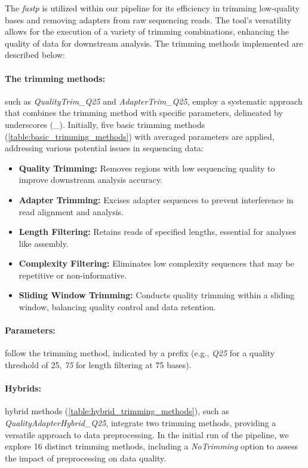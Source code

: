 The \textit{fastp} is utilized within our pipeline for its efficiency in \gls{trimming} low-quality bases and removing adapters from raw sequencing reads. The tool's versatility allows for the execution of a variety of \gls{trimming} combinations, enhancing the quality of data for downstream analysis. The \gls{trimming} methods implemented are described below:

\paragraph{The \gls{trimming} methods:} such as \textit{QualityTrim\_Q25} and \textit{AdapterTrim\_Q25}, employ a systematic approach that combines the \gls{trimming} method with specific parameters, delineated by underscores (\_). Initially, five basic \gls{trimming} methods (\autoref{table:basic_trimming_methods}) with averaged parameters are applied, addressing various potential issues in sequencing data:

\begin{itemize}
    \item \textbf{Quality Trimming:} Removes regions with low sequencing quality to improve downstream analysis accuracy.
    \item \textbf{Adapter Trimming:} Excises adapter sequences to prevent interference in read alignment and analysis.
    \item \textbf{Length Filtering:} Retains reads of specified lengths, essential for analyses like assembly.
    \item \textbf{Complexity Filtering:} Eliminates low complexity sequences that may be repetitive or non-informative.
    \item \textbf{Sliding Window Trimming:} Conducts quality trimming within a sliding window, balancing quality control and data retention.
\end{itemize}

\paragraph{Parameters:} follow the \gls{trimming} method, indicated by a prefix (e.g., \textit{Q25} for a quality threshold of 25, \textit{75} for length filtering at 75 bases). 

\paragraph{Hybrids:}
hybrid methods (\autoref{table:hybrid_trimming_methods}), such as \textit{QualityAdapterHybrid\_Q25}, integrate two \gls{trimming} methods, providing a versatile approach to data preprocessing. In the initial run of the pipeline, we explore 16 distinct \gls{trimming} methods, including a \textit{NoTrimming} option to assess the impact of preprocessing on data quality.

